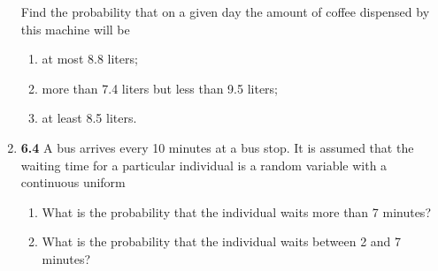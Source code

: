 \documentclass[basic, header]{nosvagor-notes}
\begin{document}
\begin{enumerate}[leftmargin=1.5em, itemsep=2em]
    Find the probability that on a given day the amount of coffee dispensed by
    this machine will be
    \begin{enumerate}[leftmargin=1.6em]

      \item at most 8.8 liters;

      \item more than 7.4 liters but less than 9.5 liters;

      \item at least 8.5 liters.

    \end{enumerate}

  \item \textbf{6.4} A bus arrives every 10 minutes at a bus stop. It is
    assumed that the waiting time for a particular individual is a random
    variable with a continuous uniform
    \begin{enumerate}[leftmargin=1.6em]

      \item What is the probability that the individual waits more than 7
        minutes?

      \item  What is the probability that the individual waits between 2 and 7
        minutes?

    \end{enumerate}

\end{enumerate}
\end{document}
